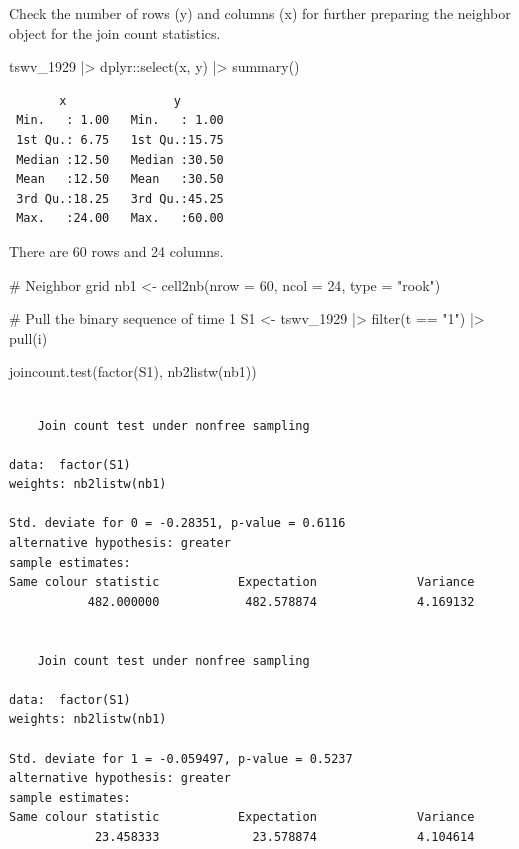 \documentclass[
  letterpaper,
  DIV=11,
  numbers=noendperiod]{scrreprt}
\newenvironment{Shaded}{\begin{snugshade}}{\end{snugshade}}
\newcommand{\AttributeTok}[1]{\textcolor[rgb]{0.40,0.45,0.13}{#1}}
\newcommand{\CommentTok}[1]{\textcolor[rgb]{0.37,0.37,0.37}{#1}}
\newcommand{\DecValTok}[1]{\textcolor[rgb]{0.68,0.00,0.00}{#1}}
\newcommand{\FunctionTok}[1]{\textcolor[rgb]{0.28,0.35,0.67}{#1}}
\newcommand{\NormalTok}[1]{\textcolor[rgb]{0.00,0.23,0.31}{#1}}
\newcommand{\OtherTok}[1]{\textcolor[rgb]{0.00,0.23,0.31}{#1}}
\newcommand{\SpecialCharTok}[1]{\textcolor[rgb]{0.37,0.37,0.37}{#1}}
\newcommand{\StringTok}[1]{\textcolor[rgb]{0.13,0.47,0.30}{#1}}
\begin{document}
Check the number of rows (y) and columns (x) for further preparing the
neighbor object for the join count statistics.

\begin{Shaded}
\begin{Highlighting}[]
\NormalTok{tswv\_1929 }\SpecialCharTok{|\textgreater{}} 
\NormalTok{  dplyr}\SpecialCharTok{::}\FunctionTok{select}\NormalTok{(x, y) }\SpecialCharTok{|\textgreater{}} 
  \FunctionTok{summary}\NormalTok{()}
\end{Highlighting}
\end{Shaded}

\begin{verbatim}
       x               y        
 Min.   : 1.00   Min.   : 1.00  
 1st Qu.: 6.75   1st Qu.:15.75  
 Median :12.50   Median :30.50  
 Mean   :12.50   Mean   :30.50  
 3rd Qu.:18.25   3rd Qu.:45.25  
 Max.   :24.00   Max.   :60.00  
\end{verbatim}

There are 60 rows and 24 columns.

\begin{Shaded}
\begin{Highlighting}[]
\CommentTok{\# Neighbor grid}
\NormalTok{nb1 }\OtherTok{\textless{}{-}} \FunctionTok{cell2nb}\NormalTok{(}\AttributeTok{nrow =} \DecValTok{60}\NormalTok{,}
               \AttributeTok{ncol =} \DecValTok{24}\NormalTok{,}
               \AttributeTok{type =} \StringTok{"rook"}\NormalTok{)}

\CommentTok{\# Pull the binary sequence of time 1}
\NormalTok{S1 }\OtherTok{\textless{}{-}}\NormalTok{ tswv\_1929 }\SpecialCharTok{|\textgreater{}}
  \FunctionTok{filter}\NormalTok{(t }\SpecialCharTok{==} \StringTok{"1"}\NormalTok{) }\SpecialCharTok{|\textgreater{}}
  \FunctionTok{pull}\NormalTok{(i)}

\FunctionTok{joincount.test}\NormalTok{(}\FunctionTok{factor}\NormalTok{(S1),}
               \FunctionTok{nb2listw}\NormalTok{(nb1))}
\end{Highlighting}
\end{Shaded}

\begin{verbatim}

    Join count test under nonfree sampling

data:  factor(S1) 
weights: nb2listw(nb1) 

Std. deviate for 0 = -0.28351, p-value = 0.6116
alternative hypothesis: greater
sample estimates:
Same colour statistic           Expectation              Variance 
           482.000000            482.578874              4.169132 


    Join count test under nonfree sampling

data:  factor(S1) 
weights: nb2listw(nb1) 

Std. deviate for 1 = -0.059497, p-value = 0.5237
alternative hypothesis: greater
sample estimates:
Same colour statistic           Expectation              Variance 
            23.458333             23.578874              4.104614 
\end{verbatim}
\end{document}
